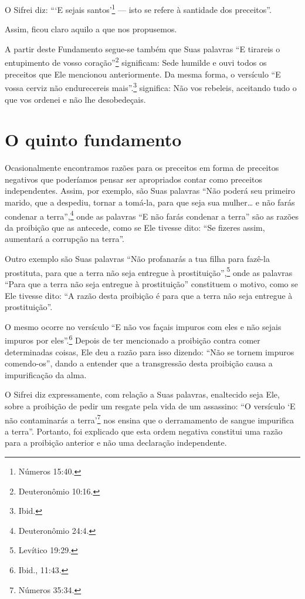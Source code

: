O Sifrei diz: ```E sejais santos'\footnote{Números 15:40.} --- isto se refere à
santidade dos preceitos''.

Assim, ficou claro aquilo a que nos propusemos.

A partir deste Fundamento segue-se também que Suas palavras ``E tirareis
o entupimento de vosso coração''\footnote{Deuteronômio 10:16.} significam: Sede
humilde e ouvi todos os preceitos que Ele mencionou anteriormente. Da
mesma forma, o versículo ``E vossa cerviz não endurecereis mais''.\footnote{Ibid.} significa: Não vos rebeleis, aceitando tudo o que vos ordenei e
não lhe desobedeçais.

\chapter*{O quinto fundamento}

Ocasionalmente encontramos razões para os preceitos em forma de
preceitos negativos que poderíamos pensar ser apropriados contar como
preceitos independentes. Assim, por exemplo, são Suas palavras ``Não
poderá seu primeiro marido, que a despediu, tornar a tomá-la, para que
seja sua mulher\ldots{} e não farás condenar a terra'',\footnote{Deuteronômio 24:4.}
onde as palavras ``E não farás condenar a terra'' são as razões da
proibição que as antecede, como se Ele tivesse dito: ``Se fizeres assim,
aumentará a corrupção na terra''.

Outro exemplo são Suas palavras ``Não profanarás a tua filha para
fazê-la prostituta, para que a terra não seja entregue à prostituição'',\footnote{Levítico 19:29.} onde as palavras ``Para que a terra não seja entregue
à prostituição'' constituem o motivo, como se Ele tivesse dito: ``A
razão desta proibição é para que a terra não seja entregue à
prostituição''.

O mesmo ocorre no versículo ``E não vos façais impuros com eles e não
sejais impuros por eles''.\footnote{Ibid., 11:43.} Depois de ter mencionado a
proibição contra comer determinadas coisas, Ele deu a razão para isso
dizendo: ``Não se tornem impuros comendo-os'', dando a entender que a
transgressão desta proibição causa a impurificação da alma.

O Sifrei diz expressamente, com relação a Suas palavras, enaltecido seja
Ele, sobre a proibição de pedir um resgate pela vida de um assassino:
``O versículo `E não contaminarás a terra'\footnote{Números 35:34.} nos ensina
que o derramamento de sangue impurifica a terra''. Portanto, foi
explicado que esta ordem negativa constitui uma razão para a proibição
anterior e não uma declaração independente.


